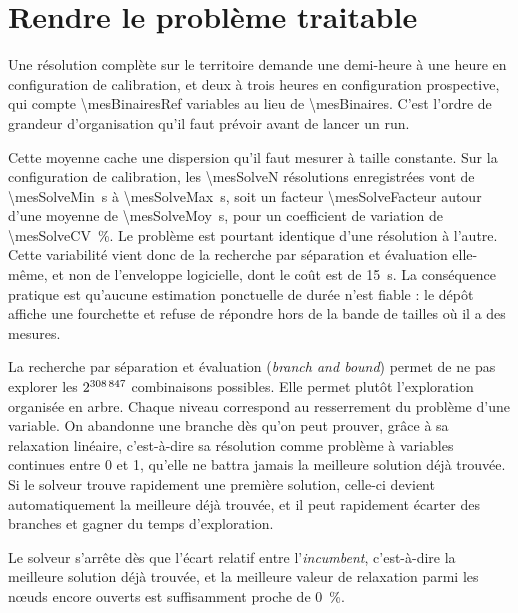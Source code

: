 \section{Rendre le problème traitable}
\label{sec:tractabilite}

Une résolution complète sur le territoire demande une demi-heure à une heure en configuration de
calibration, et deux à trois heures en configuration prospective, qui compte
\num{\mesBinairesRef} variables au lieu de \num{\mesBinaires}. C'est l'ordre de grandeur
d'organisation qu'il faut prévoir avant de lancer un run.

Cette moyenne cache une dispersion qu'il faut mesurer à taille constante. Sur la configuration de
calibration, les \num{\mesSolveN} résolutions enregistrées vont de \SI{\mesSolveMin}{\second} à
\SI{\mesSolveMax}{\second}, soit un facteur \num{\mesSolveFacteur} autour d'une moyenne de
\SI{\mesSolveMoy}{\second}, pour un coefficient de variation de \SI{\mesSolveCV}{\percent}. Le
problème est pourtant identique d'une résolution à l'autre. Cette variabilité vient donc de la
recherche par séparation et évaluation elle-même, et non de l'enveloppe logicielle, dont le coût
est de \SI{15}{\second}. La conséquence pratique est qu'aucune estimation ponctuelle de durée
n'est fiable : le dépôt affiche une fourchette et refuse de répondre hors de la bande de tailles
où il a des mesures.

La recherche par séparation et évaluation (\emph{branch and bound}) permet de ne pas explorer
les $2^{\num{308847}}$ combinaisons possibles. Elle permet plutôt l'exploration organisée
en arbre. Chaque niveau correspond au resserrement du problème d'une variable. On abandonne une
branche dès qu'on peut prouver, grâce à sa relaxation linéaire, c'est-à-dire sa résolution comme
problème à variables continues entre \num{0} et \num{1}, qu'elle ne battra jamais la meilleure
solution déjà trouvée. Si le solveur trouve rapidement une première solution, celle-ci devient
automatiquement la meilleure déjà trouvée, et il peut rapidement écarter des branches et gagner
du temps d'exploration.

Le solveur s'arrête dès que l'écart relatif entre l'\emph{incumbent}, c'est-à-dire la meilleure
solution déjà trouvée, et la meilleure valeur de relaxation parmi les n\oe uds encore ouverts
est suffisamment proche de \SI{0}{\percent}.

